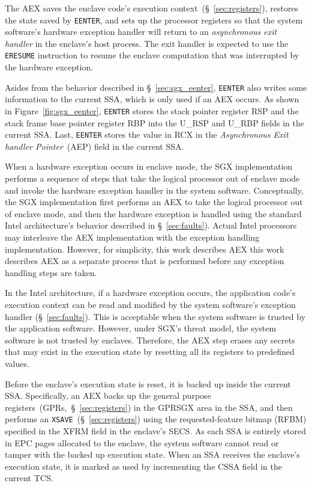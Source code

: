 The AEX saves the enclave code's execution context~(\S~\ref{sec:registers}),
restores the state saved by \texttt{EENTER}, and sets up the processor
registers so that the system software's hardware exception handler will return
to an \textit{asynchronous exit handler} in the enclave's host process. The
exit handler is expected to use the \texttt{ERESUME} instruction to resume the
enclave computation that was interrupted by the hardware exception.

Asides from the behavior described in \S~\ref{sec:sgx_eenter}, \texttt{EENTER}
also writes some information to the current SSA, which is only used if an AEX
occurs. As shown in Figure~\ref{fig:sgx_eenter}, \texttt{EENTER} stores the
stack pointer register RSP and the stack frame base pointer register RBP into
the U\_RSP and U\_RBP fields in the current SSA. Last, \texttt{EENTER} stores
the value in RCX in the \textit{Asynchronous Exit handler Pointer}~(AEP) field
in the current SSA.

When a hardware exception occurs in enclave mode, the SGX implementation
performs a sequence of steps that take the logical processor out of enclave
mode and invoke the hardware exception handler in the system software.
Conceptually, the SGX implementation first performs an AEX to take the logical
processor out of enclave mode, and then the hardware exception is handled
using the standard Intel architecture's behavior described in
\S~\ref{sec:faults}). Actual Intel processors may interleave the AEX
implementation with the exception handling implementation. However, for
simplicity, this work describes AEX this work describes AEX as a separate
process that is performed before any exception handling steps are taken.

In the Intel architecture, if a hardware exception occurs, the application
code's execution context can be read and modified by the system software's
exception handler (\S~\ref{sec:faults}). This is acceptable when the system
software is trusted by the application software. However, under SGX's threat
model, the system software is not trusted by enclaves. Therefore, the AEX step
erases any secrets that may exist in the execution state by resetting all its
registers to predefined values.

Before the enclave's execution state is reset, it is backed up inside the
current SSA. Specifically, an AEX backs up the general purpose
registers~(GPRs,~\S~\ref{sec:registers}) in the GPRSGX area in the SSA, and
then performs an \texttt{XSAVE}~(\S~\ref{sec:registers}) using the
requested-feature bitmap (RFBM) specified in the XFRM field in the enclave's
SECS. As each SSA is entirely stored in EPC pages allocated to the enclave, the
system software cannot read or tamper with the backed up execution state. When
an SSA receives the enclave's execution state, it is marked as used by
incrementing the CSSA field in the current TCS.

